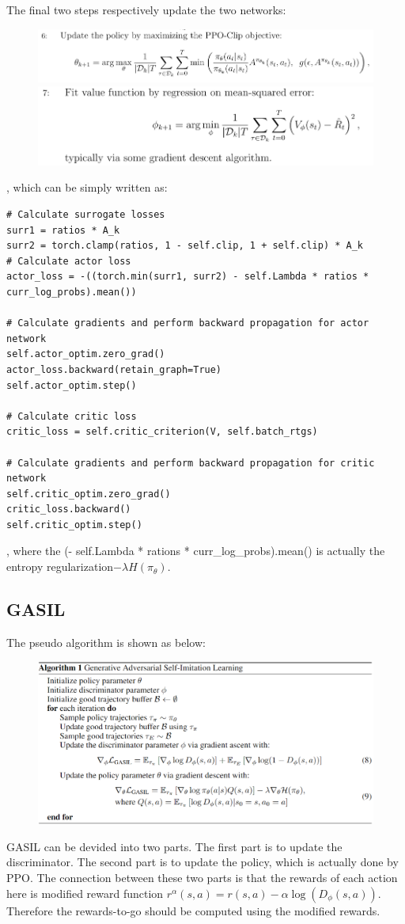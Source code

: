 \documentclass[UTF8, a4paper, 11pt]{article}
\begin{document}
The final two steps respectively update the two networks:
\begin{figure}[H]
    \centering
    \includegraphics[width = \textwidth]{step6.png}
    \includegraphics[width = \textwidth]{step7.png}
\end{figure}
, which can be simply written as:
\begin{lstlisting}
# Calculate surrogate losses
surr1 = ratios * A_k
surr2 = torch.clamp(ratios, 1 - self.clip, 1 + self.clip) * A_k
# Calculate actor loss
actor_loss = -((torch.min(surr1, surr2) - self.Lambda * ratios * curr_log_probs).mean())

# Calculate gradients and perform backward propagation for actor network
self.actor_optim.zero_grad()
actor_loss.backward(retain_graph=True)
self.actor_optim.step()

# Calculate critic loss
critic_loss = self.critic_criterion(V, self.batch_rtgs)

# Calculate gradients and perform backward propagation for critic network
self.critic_optim.zero_grad()
critic_loss.backward()
self.critic_optim.step()
\end{lstlisting}
, where the (- self.Lambda * rations * curr\_log\_probs).mean() is actually the entropy regularization$-\lambda H(\pi_\theta)$.
\subsection{GASIL}
The pseudo algorithm is shown as below:
\begin{figure}[H]
    \centering
    \includegraphics[width = \textwidth]{algorithm.png}
\end{figure}
GASIL can be devided into two parts. The first part is to update the discriminator. The second part is to update the policy, which is actually done by PPO. The
connection between these two parts is that the rewards of each action here is modified reward function $r^\alpha(s,a)=r(s,a)-\alpha\log(D_\phi(s,a))$. Therefore the
rewards-to-go should be computed using the modified rewards.
\end{document}
